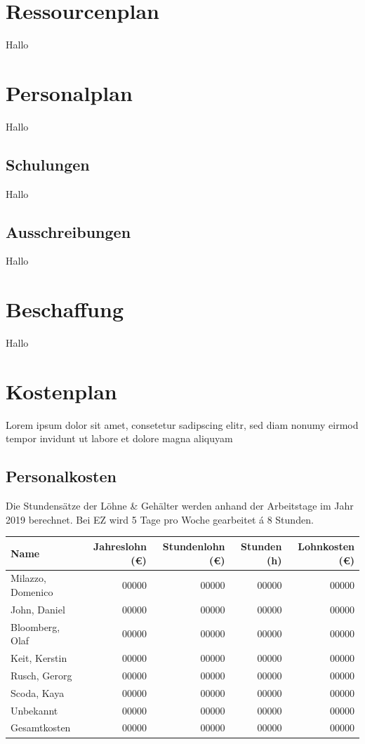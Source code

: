 \documentclass[a4paper,10pt]{scrartcl}
\begin{document}
\section{Ressourcenplan}
Hallo

\section{Personalplan}
Hallo

\subsection{Schulungen}
Hallo

\subsection{Ausschreibungen}
Hallo

\section{Beschaffung}
Hallo

\section{Kostenplan}
Lorem ipsum dolor sit amet, consetetur sadipscing elitr, sed diam nonumy eirmod tempor invidunt ut labore et dolore magna aliquyam

\subsection{Personalkosten}
Die Stundensätze der Löhne \& Gehälter werden anhand der Arbeitstage im Jahr 2019 berechnet. Bei EZ wird 5 Tage pro Woche gearbeitet á 8 Stunden.
\hfill \vspace{5mm}
\begin{tabular}{lrrrr} 
\toprule
\textbf{Name} & \textbf{Jahreslohn (\euro{})} & \textbf{Stundenlohn (\euro{})} & \textbf{Stunden (h)} & \textbf{Lohnkosten (\euro{})}\\ 
\midrule 
Milazzo, Domenico  & 00000 & 00000 & 00000 & 00000\\
John, Daniel  & 00000 & 00000 & 00000 & 00000\\
Bloomberg, Olaf  & 00000 & 00000 & 00000 & 00000\\
Keit, Kerstin  & 00000 & 00000 & 00000 & 00000\\
Rusch, Gerorg & 00000 & 00000 & 00000 & 00000\\
Scoda, Kaya & 00000 & 00000 & 00000 & 00000\\
Unbekannt & 00000 & 00000 & 00000 & 00000\\
\midrule 
\midrule 
Gesamtkosten & 00000 & 00000 & 00000 & 00000\\ 
\bottomrule
\end{tabular}
\end{document}
